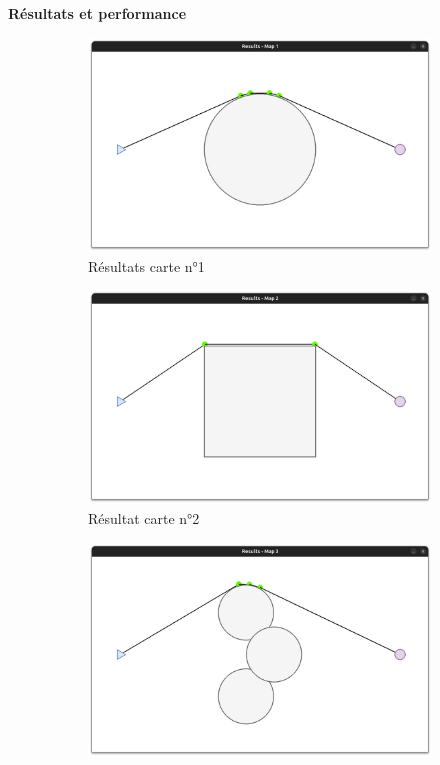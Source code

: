 \documentclass[aspectratio=169,10pt]{beamer}
\begin{document}
\begin{frame}{\textbf{Résultats et performance}}
    \begin{figure}[H]
		\centering
		\begin{subfigure}[b]{0.24\textwidth}
			\centering
			\includegraphics[width=\textwidth]{IMAGES/rmap1.png}
			\caption*{Résultats carte n°1}
			\label{fig:rmap1}
		\end{subfigure}
		\hfill
		\begin{subfigure}[b]{0.24\textwidth}
			\centering
			\includegraphics[width=\textwidth]{IMAGES/rmap2.png}
			\caption*{Résultat carte n°2}
			\label{fig:rmap2}
		\end{subfigure}
		\hfill
		\begin{subfigure}[b]{0.24\textwidth}
			\centering
			\includegraphics[width=\textwidth]{IMAGES/rmap3.png}

\end{subfigure}
\end{figure}
\end{frame}
\end{document}
